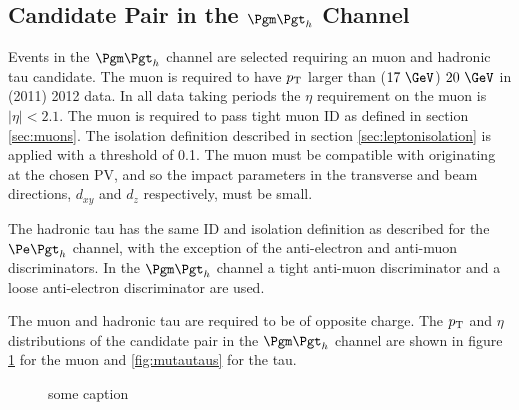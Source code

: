 \subsection{Candidate Pair in the $\mutau$ Channel}

Events in the $\mutau$ channel are selected requiring an muon and hadronic tau
candidate. The muon is required to have $p_{\mathrm{T}}$ larger than ($17~\GeV$)
$20~\GeV$ in (2011) 2012 data. In all data taking periods the $\eta$ requirement
on the muon is $|\eta| < 2.1$. The muon is required to pass tight muon ID as
defined in section \ref{sec:muons}. The isolation definition described in 
section \ref{sec:leptonisolation} is
applied with a threshold of 0.1. The muon must be compatible with
originating at the chosen \ac{PV}, and so the impact parameters in the
transverse and beam directions, $d_{xy}$ and $d_{z}$ respectively, must be
small. 

The hadronic tau has the same ID and isolation definition as described for the $\etau$
channel, with the exception of the anti-electron and anti-muon discriminators.
In the $\mutau$ channel a tight anti-muon discriminator and a loose
anti-electron discriminator are used. 

The muon and hadronic tau are required to be of opposite charge. 
The $p_{\mathrm{T}}$ and $\eta$ distributions of the candidate pair in the
$\mutau$ channel are shown in figure \ref{fig:mutaumuons} for the muon and
\ref{fig:mutautaus} for the tau. 


\begin{figure}[htb]
\begin{center}

\end{center}
\caption{
    some caption 
}
\label{fig:mutaumuons}
\end{figure}


